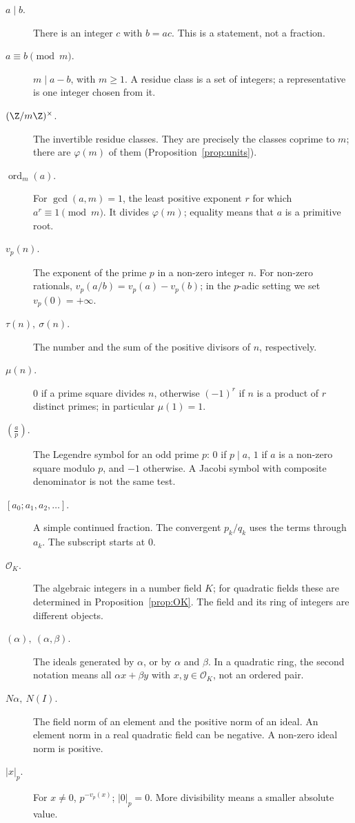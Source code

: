\begin{description}
\item[$a\mid b$.] There is an integer $c$ with $b=ac$. This is a statement, not a fraction.
\item[$a\equiv b\pmod m$.] $m\mid a-b$, with $m\ge1$. A residue class is a set of integers; a representative is
one integer chosen from it.
\item[$(\Z/m\Z)^\times$.] The invertible residue classes. They are precisely the classes coprime to $m$;
there are $\varphi(m)$ of them (Proposition~\ref{prop:units}).
\item[$\operatorname{ord}_m(a)$.] For $\gcd(a,m)=1$, the least positive exponent $r$ for which
$a^r\equiv1\pmod m$. It divides $\varphi(m)$; equality means that $a$ is a primitive root.
\item[$v_p(n)$.] The exponent of the prime $p$ in a non-zero integer $n$. For non-zero rationals,
$v_p(a/b)=v_p(a)-v_p(b)$; in the $p$-adic setting we set $v_p(0)=+\infty$.
\item[$\tau(n),\ \sigma(n)$.] The number and the sum of the positive divisors of $n$, respectively.
\item[$\mu(n)$.] $0$ if a prime square divides $n$, otherwise $(-1)^r$ if $n$ is a product of $r$ distinct
primes; in particular $\mu(1)=1$.
\item[$\left(\frac ap\right)$.] The Legendre symbol for an odd prime $p$: $0$ if $p\mid a$, $1$ if $a$ is a
non-zero square modulo $p$, and $-1$ otherwise. A Jacobi symbol with composite denominator is not the same test.
\item[{$[a_0;a_1,a_2,\ldots]$.}] A simple continued fraction. The convergent $p_k/q_k$ uses the terms through
$a_k$. The subscript starts at $0$.
\item[$\mathcal O_K$.] The algebraic integers in a number field $K$; for quadratic fields these are determined
in Proposition~\ref{prop:OK}. The field and its ring of integers are different objects.
\item[$(\alpha),\ (\alpha,\beta)$.] The ideals generated by $\alpha$, or by $\alpha$ and $\beta$. In a quadratic
ring, the second notation means all $\alpha x+\beta y$ with $x,y\in\mathcal O_K$, not an ordered pair.
\item[$N\alpha,\ N(I)$.] The field norm of an element and the positive norm of an ideal. An element norm in a
real quadratic field can be negative. A non-zero ideal norm is positive.
\item[$|x|_p$.] For $x\ne0$, $p^{-v_p(x)}$; $|0|_p=0$. More divisibility means a smaller absolute value.

\end{description}
